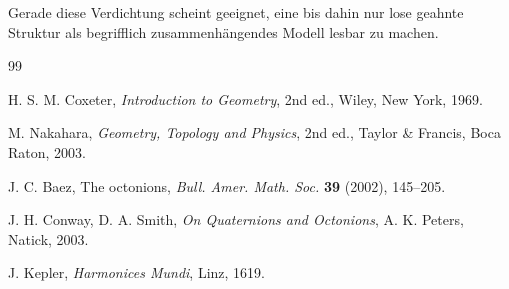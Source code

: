 \documentclass[11pt,a4paper]{article}
\theoremstyle{remark}
\begin{document}
	Gerade diese Verdichtung scheint geeignet, eine bis dahin nur lose geahnte Struktur als begrifflich zusammenhängendes Modell lesbar zu machen.
	
	\begin{thebibliography}{99}
		
		H. S. M. Coxeter,
		\emph{Introduction to Geometry},
		2nd ed., Wiley, New York, 1969.
		
		M. Nakahara,
		\emph{Geometry, Topology and Physics},
		2nd ed., Taylor \& Francis, Boca Raton, 2003.
		
		J. C. Baez,
		The octonions,
		\emph{Bull. Amer. Math. Soc.} \textbf{39} (2002), 145--205.
		
		J. H. Conway, D. A. Smith,
		\emph{On Quaternions and Octonions},
		A. K. Peters, Natick, 2003.
		
		J. Kepler,
		\emph{Harmonices Mundi},
		Linz, 1619.
		
	\end{thebibliography}
	
\end{document}
